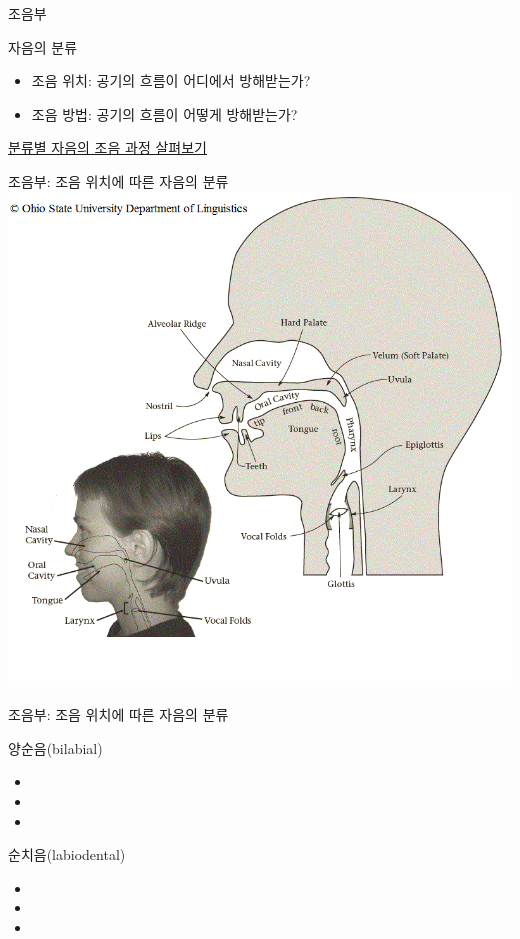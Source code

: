 \documentclass[11pt, aspectratio=169]{beamer}
\begin{document}
\begin{frame}[t]{조음부}
    \begin{block}{자음의 분류}
        \begin{itemize}
            \item 조음 위치: 공기의 흐름이 어디에서 방해받는가? 
            \item 조음 방법: 공기의 흐름이 어떻게 방해받는가?
        \end{itemize}
    \end{block}
     \href{https://seeingspeech.ac.uk}{\underline{분류별 자음의 조음 과정 살펴보기}}
\end{frame}

\begin{frame}[t]{조음부: 조음 위치에 따른 자음의 분류}
    \centering
    \includegraphics[height=1.0\textheight]{img/Saggital.png}
\end{frame}

\begin{frame}[t]{조음부: 조음 위치에 따른 자음의 분류}
    \begin{block}{양순음(bilabial)}
        \begin{itemize}
            \item 
            \item 
            \item 
        \end{itemize}
    \end{block}
    \begin{block}{순치음(labiodental)}
        \begin{itemize}
            \item 
            \item 
            \item 
        \end{itemize}
    \end{block}

\end{frame}
\end{document}

